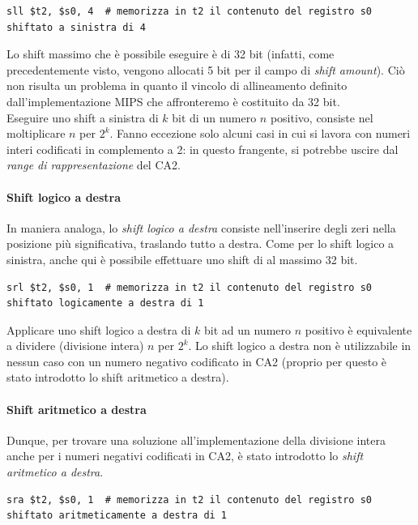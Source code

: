 \documentclass[class=book, crop=false, oneside]{standalone}
\begin{document}
\begin{verbatim}
sll $t2, $s0, 4  # memorizza in t2 il contenuto del registro s0 shiftato a sinistra di 4
\end{verbatim}

Lo shift massimo che è possibile eseguire è di 32 bit (infatti, come precedentemente visto, vengono allocati 5 bit per il campo di \emph{shift amount}). Ciò non risulta un problema in quanto il vincolo di allineamento definito dall'implementazione MIPS che affronteremo è costituito da 32 bit.\\
Eseguire uno shift a sinistra di \(k\) bit di un numero \(n\) positivo, consiste nel moltiplicare \(n\) per \(2^k\). Fanno eccezione solo alcuni casi in cui si lavora con numeri interi codificati in complemento a 2: in questo frangente, si potrebbe uscire dal \emph{range di rappresentazione} del CA2.

\paragraph{Shift logico a destra}
In maniera analoga, lo \emph{shift logico a destra} consiste nell'inserire degli zeri nella posizione più significativa, traslando tutto a destra. Come per lo shift logico a sinistra, anche qui è possibile effettuare uno shift di al massimo 32 bit.

\begin{verbatim}
srl $t2, $s0, 1  # memorizza in t2 il contenuto del registro s0 shiftato logicamente a destra di 1
\end{verbatim}

Applicare uno shift logico a destra di \(k\) bit ad un numero \(n\) positivo è equivalente a dividere (divisione intera) \(n\) per \(2^k\). Lo shift logico a destra non è utilizzabile in nessun caso con un numero negativo codificato in CA2 (proprio per questo è stato introdotto lo shift aritmetico a destra).

\paragraph{Shift aritmetico a destra}
Dunque, per trovare una soluzione all'implementazione della divisione intera anche per i numeri negativi codificati in CA2, è stato introdotto lo \emph{shift aritmetico a destra}.

\begin{verbatim}
sra $t2, $s0, 1  # memorizza in t2 il contenuto del registro s0 shiftato aritmeticamente a destra di 1
\end{verbatim}
\end{document}
